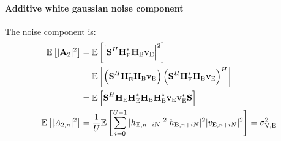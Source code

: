 \paragraph*{Additive white gaussian noise component}
The noise component is:
\begin{subequations}
    \begin{align}
        \EX{|\textbf{A}_{2}|^2} &=  \EX{\module{\spread^H \HE^* \HB \ve}^2} \\
        &= \EX{\left(\spread^H \HE^* \HB \ve \right)\left(\spread^H \HE^* \HB \ve \right)^H} \\
        &=\EX{\spread^H   \HE \HE^* \HB\HB^*  \ve \ve^* \spread } \\
       \EX{|A_{2,n}|^2} &= \frac{1}{U} \EX{\sum_{i=0}^{U-1} |h_{\text{E}, n + iN}|^2 |h_{\text{B}, n + iN}|^2 |v_{\text{E}, n + iN}|^2} = \sigma^2_{\text{V,E}}
    \end{align}
    \label{eq:appA:noise_eve_filt1}
\end{subequations}





